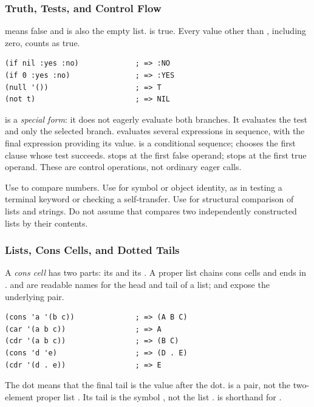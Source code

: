 \subsubsection{Truth, Tests, and Control Flow}

 means false and is also the empty list.  is true.
Every value other than , including zero, counts as true.
\begin{lstlisting}
(if nil :yes :no)             ; => :NO
(if 0 :yes :no)               ; => :YES
(null '())                    ; => T
(not t)                       ; => NIL
\end{lstlisting}
 is a \emph{special form}: it does not eagerly evaluate both
branches. It evaluates the test and only the selected branch.
 evaluates several expressions in sequence, with the final
expression providing its value.  is a conditional sequence;
 chooses the first clause whose test succeeds.
 stops at the first false operand;  stops at the
first true operand. These are control operations, not ordinary eager calls.

Use \code{=} to compare numbers. Use  for symbol or object
identity, as in testing a terminal keyword or checking a self-transfer.
Use  for structural comparison of lists and strings.
Do not assume that  compares two independently constructed
lists by their contents.

\subsubsection{Lists, Cons Cells, and Dotted Tails}

A \emph{cons cell} has two parts: its  and its .
A proper list chains cons cells and ends in .
 and  are readable names for the head and tail
of a list;  and  expose the underlying pair.
\begin{lstlisting}
(cons 'a '(b c))              ; => (A B C)
(car '(a b c))                ; => A
(cdr '(a b c))                ; => (B C)
(cons 'd 'e)                  ; => (D . E)
(cdr '(d . e))                ; => E
\end{lstlisting}
The dot means that the final tail is the value after the dot.
 is a pair, not the two-element proper list .
Its tail is the symbol , not the list .
 is shorthand for .

